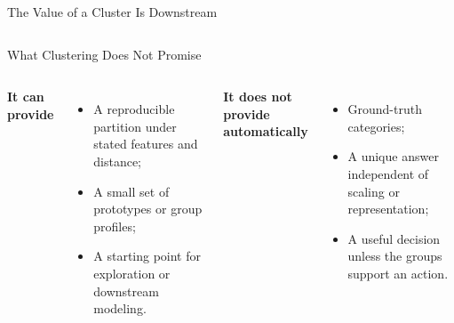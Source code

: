 \begin{frame}{The Value of a Cluster Is Downstream}
  \begin{columns}[T,onlytextwidth]
  \end{columns}

  \vspace{.55cm}
\end{frame}

\begin{frame}{What Clustering Does Not Promise}
  \begin{columns}[T,onlytextwidth]
      \textbf{It can provide}
      \begin{itemize}\spaceditems
        \item A reproducible partition under stated features and distance;
        \item A small set of prototypes or group profiles;
        \item A starting point for exploration or downstream modeling.
      \end{itemize}

      \textbf{It does not provide automatically}
      \begin{itemize}\spaceditems
        \item Ground-truth categories;
        \item A unique answer independent of scaling or representation;
        \item A useful decision unless the groups support an action.
      \end{itemize}
  \end{columns}
\end{frame}
